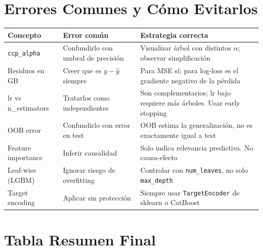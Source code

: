 \documentclass[11pt, a4paper]{book}
\begin{document}
\section{Errores Comunes y Cómo Evitarlos}

\begin{center}
  \begin{tabular}{lp{4.5cm}p{5.5cm}}
    \toprule
    \textbf{Concepto} & \textbf{Error común} & \textbf{Estrategia correcta}\\
    \midrule
    \texttt{ccp\_alpha} & Confundirlo con umbral de precisión &
      Visualizar árbol con distintos $\alpha$; observar simplificación\\
    Residuos en GB & Creer que es $y - \hat{y}$ siempre &
      Para MSE sí; para log-loss es el gradiente negativo de la pérdida\\
    lr vs n\_estimators & Tratarlos como independientes &
      Son complementarios; lr bajo requiere más árboles. Usar early stopping\\
    OOB error & Confundirlo con error en test &
      OOB estima la generalización, no es exactamente igual a test\\
    Feature importance & Inferir causalidad &
      Solo indica relevancia predictiva. No causa-efecto\\
    Leaf-wise (LGBM) & Ignorar riesgo de overfitting &
      Controlar con \texttt{num\_leaves}, no solo \texttt{max\_depth}\\
    Target encoding & Aplicar sin protección &
      Siempre usar \texttt{TargetEncoder} de sklearn o CatBoost\\
    \bottomrule
  \end{tabular}
\end{center}

\section{Tabla Resumen Final}
\end{document}
